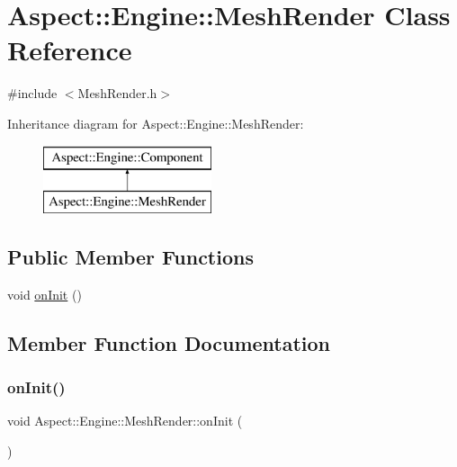 \hypertarget{class_aspect_1_1_engine_1_1_mesh_render}{}\section{Aspect\+:\+:Engine\+:\+:Mesh\+Render Class Reference}
\label{class_aspect_1_1_engine_1_1_mesh_render}


{\ttfamily \#include $<$Mesh\+Render.\+h$>$}

Inheritance diagram for Aspect\+:\+:Engine\+:\+:Mesh\+Render\+:\begin{figure}[H]
\begin{center}
\leavevmode
\includegraphics[height=2.000000cm]{class_aspect_1_1_engine_1_1_mesh_render}
\end{center}
\end{figure}
\subsection*{Public Member Functions}
\begin{DoxyCompactItemize}
\item 
void \mbox{\hyperlink{class_aspect_1_1_engine_1_1_mesh_render_a54bb4394dafdc30e919a0ba5d9854871}{on\+Init}} ()
\end{DoxyCompactItemize}


\subsection{Member Function Documentation}
\mbox{\label{class_aspect_1_1_engine_1_1_mesh_render_a54bb4394dafdc30e919a0ba5d9854871}} 
\subsubsection{\texorpdfstring{on\+Init()}{onInit()}}
{\footnotesize\ttfamily void Aspect\+::\+Engine\+::\+Mesh\+Render\+::on\+Init (\begin{DoxyParamCaption}{ }\end{DoxyParamCaption})\hspace{0.3cm}{\ttfamily [virtual]}}



